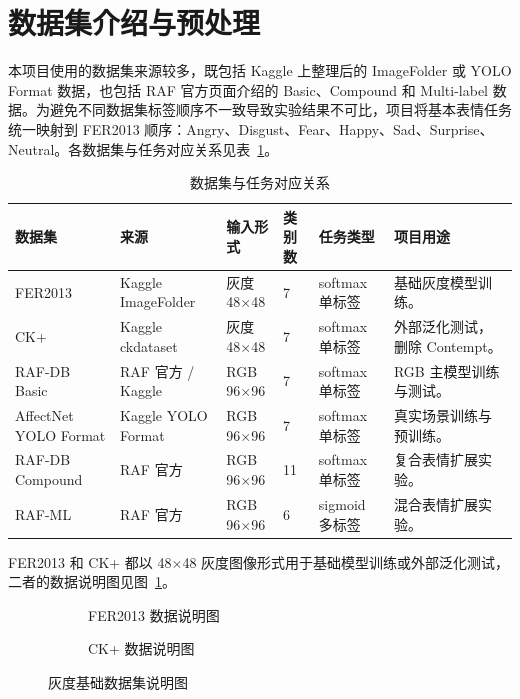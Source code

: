 \documentclass[UTF8,a4paper,12pt]{ctexart}
\newcommand{\figplaceholder}[1]{%
  \begin{center}
    \fbox{\parbox{0.78\textwidth}{\centering #1}}
  \end{center}
}
\begin{document}
\section{数据集介绍与预处理}

本项目使用的数据集来源较多，既包括 Kaggle 上整理后的 ImageFolder 或 YOLO Format 数据，也包括 RAF 官方页面介绍的 Basic、Compound 和 Multi-label 数据。为避免不同数据集标签顺序不一致导致实验结果不可比，项目将基本表情任务统一映射到 FER2013 顺序：Angry、Disgust、Fear、Happy、Sad、Surprise、Neutral。各数据集与任务对应关系见表~\ref{tab:dataset_task_map}。

\begin{table}[H]
  \centering
  \caption{数据集与任务对应关系}
  \label{tab:dataset_task_map}
  \scriptsize
  \setlength{\tabcolsep}{3pt}
  \begin{tabularx}{\textwidth}{p{}p{}p{}p{}p{}X}
    \toprule
    数据集 & 来源 & 输入形式 & 类别数 & 任务类型 & 项目用途 \\
    \midrule
    FER2013 & Kaggle ImageFolder & 灰度 48$\times$48 & 7 & softmax 单标签 & 基础灰度模型训练。\\
    CK+ & Kaggle ckdataset & 灰度 48$\times$48 & 7 & softmax 单标签 & 外部泛化测试，删除 Contempt。\\
    RAF-DB Basic & RAF 官方 / Kaggle & RGB 96$\times$96 & 7 & softmax 单标签 & RGB 主模型训练与测试。\\
    AffectNet YOLO Format & Kaggle YOLO Format & RGB 96$\times$96 & 7 & softmax 单标签 & 真实场景训练与预训练。\\
    RAF-DB Compound & RAF 官方 & RGB 96$\times$96 & 11 & softmax 单标签 & 复合表情扩展实验。\\
    RAF-ML & RAF 官方 & RGB 96$\times$96 & 6 & sigmoid 多标签 & 混合表情扩展实验。\\
    \bottomrule
  \end{tabularx}
\end{table}

FER2013 和 CK+ 都以 48$\times$48 灰度图像形式用于基础模型训练或外部泛化测试，二者的数据说明图见图~\ref{fig:gray_dataset_intro}。

\begin{figure}[H]
  \centering
  \begin{subfigure}{0.48\textwidth}
    \centering
    \figplaceholder{\rule{0pt}{1.2em}}
    \caption{FER2013 数据说明图}
  \end{subfigure}
  \hfill
  \begin{subfigure}{0.48\textwidth}
    \centering
    \figplaceholder{\rule{0pt}{1.2em}}
    \caption{CK+ 数据说明图}
  \end{subfigure}
  \caption{灰度基础数据集说明图}
  \label{fig:gray_dataset_intro}
\end{figure}
\end{document}
